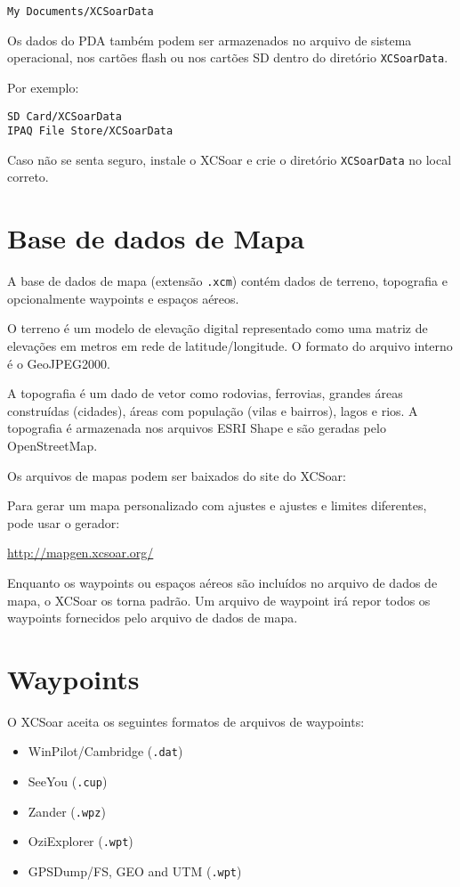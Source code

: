 \begin{verbatim}
My Documents/XCSoarData
\end{verbatim}

Os dados do PDA também podem ser armazenados no arquivo de sistema operacional, nos cartões flash ou nos cartões SD dentro do diretório 
\verb|XCSoarData|.

Por exemplo:
\begin{verbatim}
SD Card/XCSoarData
IPAQ File Store/XCSoarData
\end{verbatim}

Caso não se senta seguro, instale o XCSoar e crie o diretório  \verb|XCSoarData|
no local correto. 
 

\section{Base de dados de Mapa}\label{sec:map}

A base de dados de mapa (extensão  \verb|.xcm|) contém dados de terreno, topografia e opcionalmente waypoints e espaços aéreos.

O terreno é um modelo de elevação digital representado como uma matriz de elevações em metros em rede de latitude/longitude.  O formato do arquivo interno é o GeoJPEG2000.

A topografia é um dado de vetor como rodovias, ferrovias, grandes áreas construídas (cidades), áreas com população (vilas e bairros), lagos e rios.  A topografia é armazenada nos arquivos ESRI Shape e são geradas pelo OpenStreetMap.

Os arquivos de mapas podem ser baixados do site do XCSoar:



Para gerar um mapa personalizado com ajustes e ajustes e limites diferentes, pode usar o gerador:

\url{http://mapgen.xcsoar.org/}

Enquanto os waypoints ou espaços aéreos são incluídos no arquivo de dados de mapa, o XCSoar os torna padrão.  Um arquivo de waypoint irá repor todos os waypoints fornecidos pelo arquivo de dados de mapa.

\section{Waypoints}

O XCSoar aceita os seguintes formatos de arquivos de waypoints:

\begin{itemize}
\item WinPilot/Cambridge (\verb|.dat|)
\item SeeYou (\verb|.cup|)
\item Zander (\verb|.wpz|)
\item OziExplorer (\verb|.wpt|)
\item GPSDump/FS, GEO and UTM (\verb|.wpt|)
\end{itemize}


